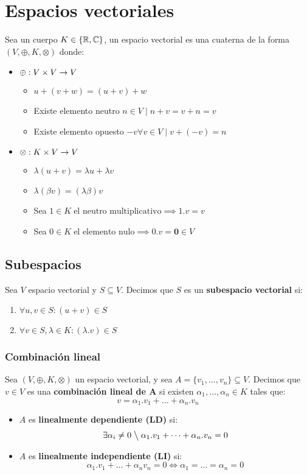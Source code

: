 \section*{Espacios vectoriales}
Sea un cuerpo \(K \in \{\mathbb{R},\mathbb{C}\}\), un espacio vectorial es una cuaterna de la forma \(\left(V,\oplus,K,\otimes\right)\) donde:
\begin{itemize}
    \item \(\oplus : V \times V \to V\)
    \begin{itemize}
        \item \(u + (v + w) = (u+v) + w\)
        \item Existe elemento neutro \(n \in V \; \big| \; n +v = v+n = v\)
        \item Existe elemento opuesto \(-v \forall v \in V \; \big| \; v + (-v) = n\)
    \end{itemize}
    
    \item \(\otimes: K \times V \to V\)
    \begin{itemize}
        \item \(\lambda(u+v) = \lambda u + \lambda v\)
        \item \(\lambda(\beta v) = (\lambda \beta) v\)
        \item Sea \(1 \in K \; \text{el neutro multiplicativo} \implies 1.v = v\)

        \item Sea \(0 \in K \; \text{el elemento nulo} \implies 0.v = \mathbf{0} \in V\)
    \end{itemize}
    
\end{itemize}
\subsection*{Subespacios}
Sea \(V\) espacio vectorial y \(S \subseteq V\). Decimos que \(S\) es un \textbf{subespacio vectorial} si:
\begin{enumerate}
    \item \(\forall u,v \in S : (u+v) \in S\)
    \item \(\forall v \in S, \lambda \in K: (\lambda . v) \in S\)
\end{enumerate}
\subsubsection*{Combinación lineal}
Sea \((V,\oplus,K,\otimes)\) un espacio vectorial, y sea \(A = \{v_1,\dots,v_n\} \subseteq V\). Decimos que \(v\in V\) es una \textbf{combinación lineal de A} si existen \(\alpha_1,\dots,\alpha_n \in K\) tales que:
\[v = \alpha_1.v_1 + \dots + \alpha_n . v_n\] 
\begin{itemize}
    \item \(A\) es \textbf{linealmente dependiente (LD)} si:
     \[\exists \alpha_i \neq 0 \; \big\backslash \; \alpha_1.v_1 + \dots + \alpha_n . v_n = 0\]
    \item \(A\) es \textbf{linealmente independiente (LI)} si:
     \[\alpha_1.v_1 + \dots + \alpha_n v_n = 0 \iff \alpha_1 = \dots = \alpha_n = 0\] 
\end{itemize}
